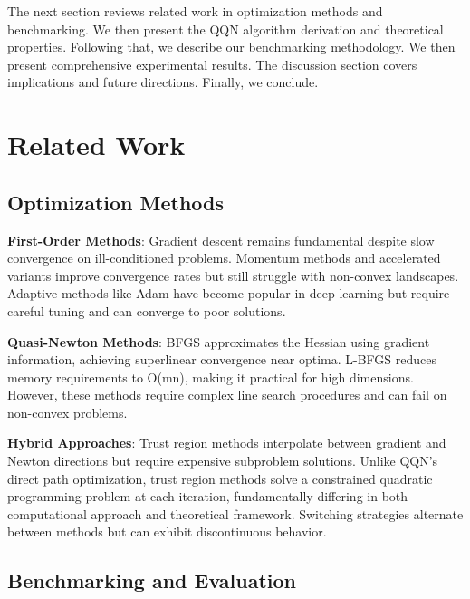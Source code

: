 The next section reviews related work in optimization methods and benchmarking.
We then present the QQN algorithm derivation and theoretical properties.
Following that, we describe our benchmarking methodology.
We then present comprehensive experimental results.
The discussion section covers implications and future directions.
Finally, we conclude.

\hypertarget{related-work}{%
\section{Related Work}\label{related-work}}

\hypertarget{optimization-methods}{%
\subsection{Optimization Methods}\label{optimization-methods}}

\textbf{First-Order Methods}: Gradient descent \citep{cauchy1847methode} remains fundamental despite slow convergence on ill-conditioned problems.
Momentum methods \citep{polyak1964some} and accelerated variants \citep{nesterov1983method} improve convergence rates but still struggle with non-convex landscapes.
Adaptive methods like Adam \citep{kingma2015adam} have become popular in deep learning but require careful tuning and can converge to poor solutions.

\textbf{Quasi-Newton Methods}: BFGS \citep{broyden1970convergence, fletcher1970new, goldfarb1970family, shanno1970conditioning} approximates the Hessian using gradient information, achieving superlinear convergence near optima.
L-BFGS \citep{liu1989limited} reduces memory requirements to O(mn), making it practical for high dimensions.
However, these methods require complex line search procedures and can fail on non-convex problems.

\textbf{Hybrid Approaches}: Trust region methods \citep{more1983computing} interpolate between gradient and Newton directions but require expensive subproblem solutions.
Unlike QQN's direct path optimization, trust region methods solve a constrained quadratic programming problem at each iteration, fundamentally differing in both computational approach and theoretical framework.
Switching strategies \citep{morales2000automatic} alternate between methods but can exhibit discontinuous behavior.

\hypertarget{benchmarking-and-evaluation}{%
\subsection{Benchmarking and Evaluation}\label{benchmarking-and-evaluation}}

